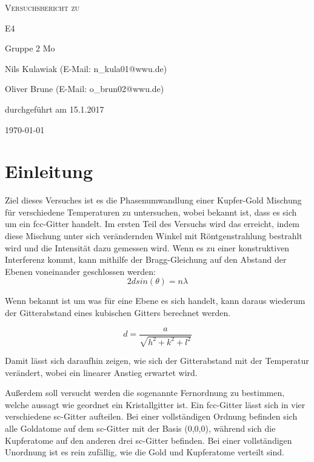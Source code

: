 \documentclass[
	a4paper,
	12pt,
	pagesize,
	ngerman
]{scrartcl}
\begin{document}
\begin{titlepage}
	\centering
	{\scshape\LARGE Versuchsbericht zu \par}
	\vspace{1cm}
	{\scshape\huge E4\par}
	\vspace{2.5cm}
	{\LARGE Gruppe 2 Mo\par}
	\vspace{0.5cm}
	{\large Nils Kulawiak (E-Mail: n\_kula01@wwu.de) \par}
	{\large Oliver Brune (E-Mail: o\_brun02@wwu.de) \par}
	\vfill
	durchgeführt am 15.1.2017\par
	
	\vfill

	{\large \today\par}
\end{titlepage}


\tableofcontents
	
	
\newpage
\section{Einleitung}
Ziel dieses Versuches ist es die Phasenumwandlung einer Kupfer-Gold Mischung für verschiedene Temperaturen zu untersuchen, wobei bekannt ist, dass es sich um ein fcc-Gitter handelt. Im ersten Teil des Versuchs wird das erreicht, indem diese Mischung unter sich verändernden Winkel mit Röntgenstrahlung bestrahlt wird und die Intensität dazu gemessen wird. Wenn es zu einer konstruktiven Interferenz kommt, kann mithilfe der Bragg-Gleichung auf den Abstand der Ebenen voneinander geschlossen werden:
\begin{equation}
2d sin(\theta) = n \lambda
\label{bragg}
\end{equation}

Wenn bekannt ist um was für eine Ebene es sich handelt, kann daraus wiederum der Gitterabstand eines kubischen Gitters berechnet werden.

\begin{equation}
d = \frac{a}{\sqrt{h^{2}+k^{2}+l^{2}}}
\end{equation}

Damit lässt sich daraufhin zeigen, wie sich der Gitterabstand mit der Temperatur verändert, wobei ein linearer Anstieg erwartet wird.

Außerdem soll versucht werden die sogenannte Fernordnung zu bestimmen, welche aussagt wie geordnet ein Kristallgitter ist. Ein fcc-Gitter lässt sich in vier verschiedene sc-Gitter aufteilen. Bei einer vollständigen Ordnung befinden sich alle Goldatome auf dem sc-Gitter mit der Basis (0,0,0), während sich die Kupferatome auf den anderen drei sc-Gitter befinden.
Bei einer vollständigen Unordnung ist es rein zufällig, wie die Gold und Kupferatome verteilt sind.
\end{document}

